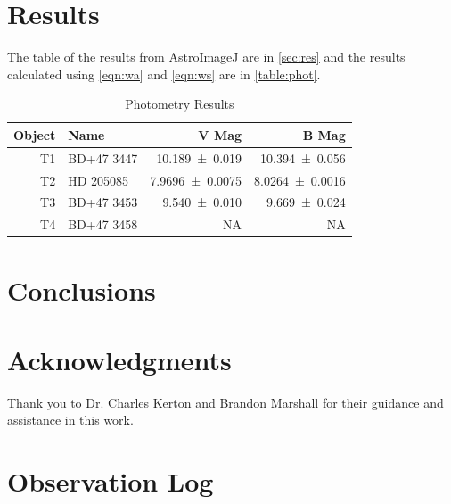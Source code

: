 \documentclass[%
aip,
jmp,
reprint,
floatfix
]{revtex4-1}
\begin{document}
	\section{Results}

	The table of the results from AstroImageJ are in \autoref{sec:res} and the results calculated using \autoref{eqn:wa} and \autoref{eqn:ws} are in \autoref{table:phot}. 

	\begin{table}
		\centering
		\caption{Photometry Results}
		\begin{tabular*}{0.9\linewidth}{@{\extracolsep{\fill}}rlrr}
			\hline
			Object & Name       &                  V Mag &                  B Mag \\ \hline\hline
			    T1 & BD+47 3447 &  \SI{10.189\pm0.019}{} &  \SI{10.394\pm0.056}{} \\
			    T2 & HD 205085  & \SI{7.9696\pm0.0075}{} & \SI{8.0264\pm0.0016}{} \\
			    T3 & BD+47 3453 &    \SI{9.540\pm.010}{} &   \SI{9.669\pm0.024}{} \\
			    T4 & BD+47 3458 &                     NA &                     NA \\ \hline
		\end{tabular*}
		\label{table:phot}
	\end{table}


	\section{Conclusions}



	\section*{Acknowledgments}

	Thank you to Dr. Charles Kerton and Brandon Marshall for their guidance and assistance in this work.




	\onecolumngrid
	\appendix
	\section{Observation Log}
\end{document}

